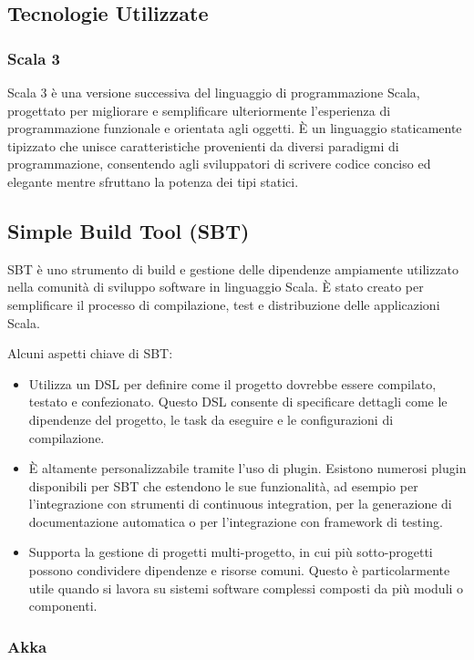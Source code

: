 \documentclass[12pt]{article}
\begin{document}
\subsection{Tecnologie Utilizzate}

\subsubsection{Scala 3}

Scala 3 è una versione successiva del linguaggio di programmazione Scala, progettato per migliorare e semplificare ulteriormente l'esperienza di programmazione funzionale e orientata agli oggetti. È un linguaggio staticamente tipizzato che unisce caratteristiche provenienti da diversi paradigmi di programmazione, consentendo agli sviluppatori di scrivere codice conciso ed elegante mentre sfruttano la potenza dei tipi statici.

\subsection{Simple Build Tool (SBT)}

SBT è uno strumento di build e gestione delle dipendenze ampiamente utilizzato nella comunità di sviluppo software in linguaggio Scala. È stato creato per semplificare il processo di compilazione, test e distribuzione delle applicazioni Scala.

Alcuni aspetti chiave di SBT:

\begin{itemize}
    \item Utilizza un DSL per definire come il progetto dovrebbe essere compilato, testato e confezionato. Questo DSL consente di specificare dettagli come le dipendenze del progetto, le task da eseguire e le configurazioni di compilazione.
    \item È altamente personalizzabile tramite l'uso di plugin. Esistono numerosi plugin disponibili per SBT che estendono le sue funzionalità, ad esempio per l'integrazione con strumenti di continuous integration, per la generazione di documentazione automatica o per l'integrazione con framework di testing.
    \item Supporta la gestione di progetti multi-progetto, in cui più sotto-progetti possono condividere dipendenze e risorse comuni. Questo è particolarmente utile quando si lavora su sistemi software complessi composti da più moduli o componenti.
\end{itemize}

\subsubsection{Akka}
\end{document}
